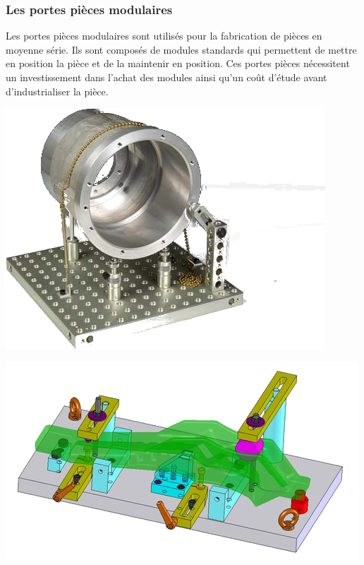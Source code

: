 \documentclass[11pt,oneside]{article}
\begin{document}
\subsubsection{Les portes pièces modulaires}
Les portes pièces modulaires sont utilisés pour la fabrication de pièces en moyenne série. Ils sont composés de modules standards qui permettent de mettre en position la pièce et de la maintenir en position. Ces portes pièces nécessitent un investissement dans l'achat des modules ainsi qu'un coût d'étude avant d'industrialiser la pièce. 

\begin{minipage}[c]{.3\linewidth}
\begin{center}
\includegraphics[width=.95\textwidth]{png/modulaire_1}
\end{center}
\end{minipage} \hfill
\begin{minipage}[c]{.3\linewidth}
\begin{center}
\includegraphics[width=.95\textwidth]{png/modulaire_2}
\end{center}
\end{minipage}\hfill
\end{document}
